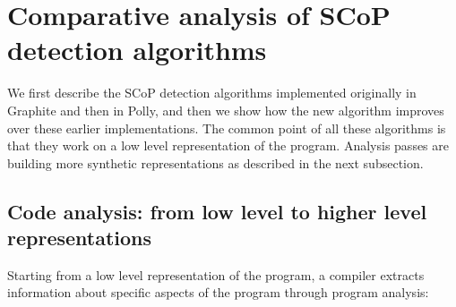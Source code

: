 \documentclass{sig-alternate}
\begin{document}
\section{Comparative analysis of SCoP detection algorithms}

We first describe the SCoP detection algorithms implemented originally in
Graphite and then in Polly, and then we show how the new algorithm improves over
these earlier implementations.  The common point of all these algorithms is that
they work on a low level representation of the program.  Analysis passes are
building more synthetic representations as described in the next subsection.

\subsection{Code analysis: from low level to higher level representations}

Starting from a low level representation of the program, a compiler extracts
information about specific aspects of the program through program analysis:
\end{document}
